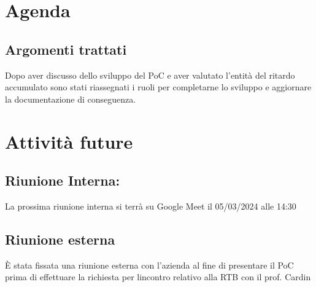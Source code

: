 \documentclass{article}
\begin{document}
\section{Agenda}
\subsection{Argomenti trattati}
Dopo aver discusso dello sviluppo del PoC e aver valutato l'entità del ritardo accumulato sono stati riassegnati i ruoli per  completarne lo sviluppo e aggiornare la documentazione di conseguenza.
\section{Attività future}
\subsection{Riunione Interna:}
La prossima riunione interna si terrà su Google Meet il 05/03/2024 alle 14:30
\subsection{Riunione esterna}
È stata fissata una riunione esterna con l'azienda al fine di presentare il PoC prima di effettuare la richiesta per lincontro relativo alla RTB con il prof. Cardin 
\end{document}
